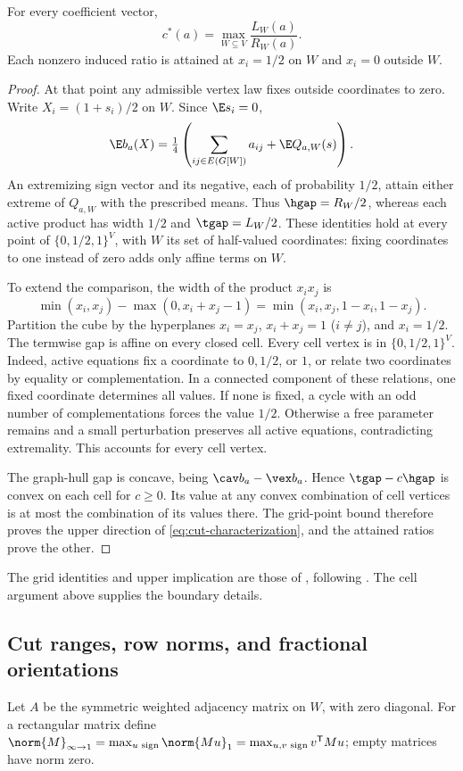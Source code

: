 \begin{lemma}\label{lem:induced-cut}
For every coefficient vector,
\begin{equation}\label{eq:cut-characterization}
 c^*(a)=\max_{W\subseteq V}\frac{L_W(a)}{R_W(a)}.
\end{equation}
Each nonzero induced ratio is attained at $x_i=1/2$ on $W$ and $x_i=0$
outside $W$.
\end{lemma}
\begin{proof}
At that point any admissible vertex law fixes outside coordinates to zero.
Write $X_i=(1+s_i)/2$ on $W$. Since $\E s_i=0$,
\[
 \E b_a(X)=\tfrac14\left(\sum_{ij\in E(G[W])}a_{ij}+\E Q_{a,W}(s)\right).
\]
An extremizing sign vector and its negative, each of probability $1/2$,
attain either extreme of $Q_{a,W}$ with the prescribed means. Thus
$\hgap=R_W/2$, whereas each active product has width $1/2$ and
$\tgap=L_W/2$. These identities hold at every point of
$\{0,1/2,1\}^V$, with $W$ its set of half-valued coordinates: fixing
coordinates to one instead of zero adds only affine terms on $W$.

To extend the comparison, the width of the product $x_ix_j$ is
\[
 \min(x_i,x_j)-\max(0,x_i+x_j-1)
 =\min(x_i,x_j,1-x_i,1-x_j).
\]
Partition the cube by the hyperplanes $x_i=x_j$, $x_i+x_j=1$ ($i\ne j$),
and $x_i=1/2$. The termwise gap is affine on every closed cell.
Every cell vertex is in $\{0,1/2,1\}^V$. Indeed, active equations fix a
coordinate to $0,1/2$, or $1$, or relate two coordinates by equality or
complementation. In a connected component of these relations, one fixed
coordinate determines all values. If none is fixed, a cycle with an odd
number of complementations forces the value $1/2$. Otherwise a free
parameter remains and a small perturbation preserves all active equations,
contradicting extremality. This accounts for every cell vertex.

The graph-hull gap is concave, being $\cav b_a-\vex b_a$. Hence
$\tgap-c\hgap$ is convex on each cell for $c\ge0$. Its value at any
convex combination of cell vertices is at most the combination of its
values there. The grid-point bound therefore proves the upper direction
of \eqref{eq:cut-characterization}, and the attained ratios prove the other.
\end{proof}
The grid identities and upper implication are those of
\citet[Lemma 1 and Corollary 1]{Boland2017}, following
\citet{Luedtke2012}. The cell argument above supplies the boundary details.

\subsection{Cut ranges, row norms, and fractional orientations}
Let $A$ be the symmetric weighted adjacency matrix on $W$, with zero
diagonal. For a rectangular matrix define
$\norm{M}_{\infty\to1}=\max_{u\text{ sign}}\norm{Mu}_1
=\max_{u,v\text{ sign}}v^{\mathsf T}Mu$; empty matrices have norm zero.

